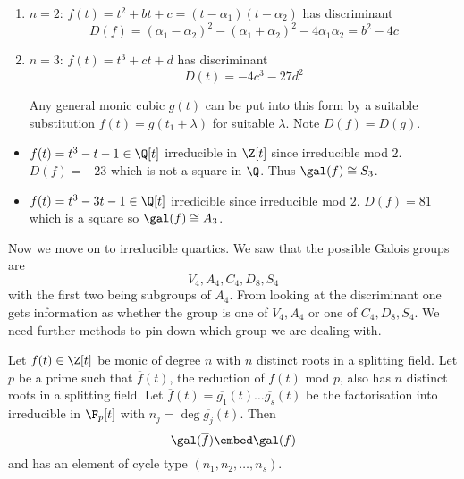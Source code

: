 \documentclass[a4paper]{article}
\newcommand*{\red}[1]{\overline{#1}}
\begin{document}
\begin{eg}\leavevmode
  \begin{enumerate}
  \item \(n = 2\): \(f(t) =t^2 + bt + c = (t - \alpha_1)(t - \alpha_2)\) has discriminant
    \[
      D(f) = (\alpha_1 - \alpha_2)^2 - (\alpha_1 + \alpha_2)^2 - 4\alpha_1\alpha_2 = b^2 - 4c
    \]
  \item \(n = 3\): \(f(t) = t^3 + ct + d\) has discriminant
    \[
      D(t) = -4c^3 - 27d^2
   \]
   \begin{remark}
     Any general monic cubic \(g(t)\) can be put into this form by a suitable substitution \(f(t) = g(t_1 + \lambda)\) for suitable \(\lambda\). Note \(D(f) = D(g)\).
   \end{remark}
 \end{enumerate}
\end{eg}

\begin{eg}\leavevmode
  \begin{itemize}
  \item \(f(t) = t^3 - t - 1 \in \Q[t]\) irreducible in \(\Z[t]\) since irreducible mod \(2\). \(D(f) = -23\) which is not a square in \(\Q\). Thus \(\gal(f) \cong S_3\).
  \item \(f(t) = t^3 - 3t - 1 \in \Q[t]\) irredicible since irreducible mod \(2\). \(D(f) = 81\) which is a square so \(\gal(f) \cong A_3\).
  \end{itemize}
\end{eg}

Now we move on to irreducible quartics. We saw that the possible Galois groups are
\[
  V_4, A_4, C_4, D_8, S_4
\]
with the first two being subgroups of \(A_4\). From looking at the discriminant one gets information as whether the group is one of \(V_4, A_4\) or one of \(C_4, D_8, S_4\). We need further methods to pin down which group we are dealing with.

\begin{theorem}
  \label{thm:mod p reduction}
  Let \(f(t) \in \Z[t]\) be monic of degree \(n\) with \(n\) distinct roots in a splitting field. Let \(p\) be a prime such that \(\red f(t)\), the reduction of \(f(t)\) mod \(p\), also has \(n\) distinct roots in a splitting field. Let \(\red f(t) = \red{g_1}(t) \dots \red{g_s}(t)\) be the factorisation into irreducible in \(\F_p[t]\) with \(n_j =  \deg \red{g_j}(t)\). Then
  \[
    \gal(\red f) \embed \gal(f)
  \]
  and has an element of cycle type \((n_1, n_2, \dots, n_s)\).
\end{theorem}
\end{document}
